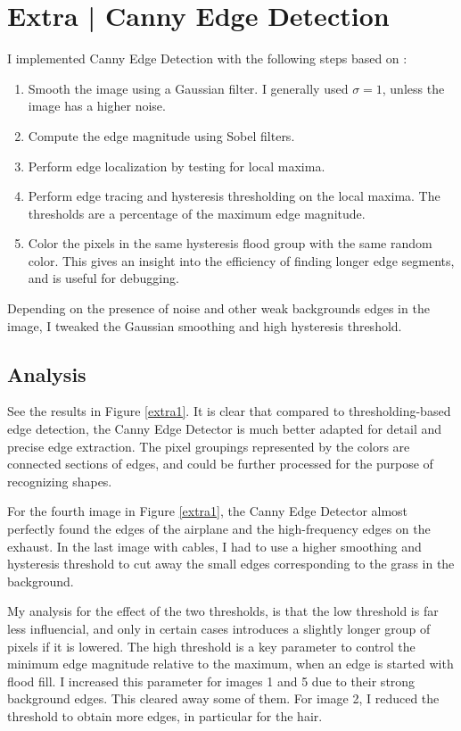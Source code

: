 \documentclass[10pt, a4paper]{article}
\begin{document}
\restoregeometry
\pagebreak

\section*{Extra | Canny Edge Detection} %

I implemented Canny Edge Detection with the following steps based on \cite{advanced_texbook}:

\begin{enumerate}
	\item Smooth the image using a Gaussian filter.
		I generally used $\sigma=1$, unless the image has a higher noise.
	\item Compute the edge magnitude using Sobel filters.
	\item Perform edge localization by testing for local maxima.
	\item Perform edge tracing and hysteresis thresholding on the local maxima.
		The thresholds are a percentage of the maximum edge magnitude.
	\item Color the pixels in the same hysteresis flood group with the same random color.
		This gives an insight into the efficiency of finding longer edge segments, and is useful
		for debugging.
\end{enumerate}

Depending on the presence of noise and other weak backgrounds edges in the image, 
I tweaked the Gaussian smoothing and high hysteresis threshold.

\subsection*{Analysis}

See the results in Figure \ref{extra1}. It is clear that compared to thresholding-based edge detection,
the Canny Edge Detector is much better adapted for detail and precise edge extraction.
The pixel groupings represented by the colors are connected sections of edges, and could be further
processed for the purpose of recognizing shapes.

For the fourth image in Figure \ref{extra1}, the Canny Edge Detector almost perfectly found the edges
of the airplane and the high-frequency edges on the exhaust. In the last image with cables, I had
to use a higher smoothing and hysteresis threshold to cut away the small edges corresponding to the
grass in the background.

My analysis for the effect of the two thresholds, is that the low threshold is far less influencial,
and only in certain cases introduces a slightly longer group of pixels if it is lowered. The high threshold
is a key parameter to control the minimum edge magnitude relative to the maximum, when an edge is started 
with flood fill. I increased this parameter for images 1 and 5 due to their strong background edges.
This cleared away some of them. For image 2, I reduced the threshold to obtain more edges, in particular for the hair.
\end{document}

